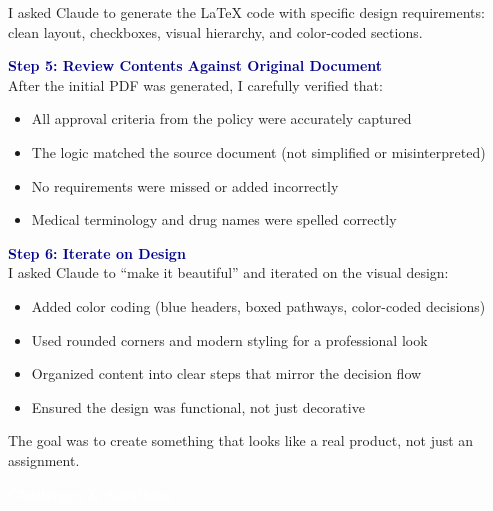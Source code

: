 \documentclass[11pt,letterpaper]{article}
\begin{document}
I asked Claude to generate the LaTeX code with specific design requirements: clean layout, checkboxes, visual hierarchy, and color-coded sections.

\vspace{0.25cm}

\textcolor{darkblue}{\bfseries\large Step 5: Review Contents Against Original Document}\\[0.1cm]
After the initial PDF was generated, I carefully verified that:
\begin{itemize}
    \item All approval criteria from the policy were accurately captured
    \item The logic matched the source document (not simplified or misinterpreted)
    \item No requirements were missed or added incorrectly
    \item Medical terminology and drug names were spelled correctly
\end{itemize}

\vspace{0.25cm}

\textcolor{darkblue}{\bfseries\large Step 6: Iterate on Design}\\[0.1cm]
I asked Claude to ``make it beautiful'' and iterated on the visual design:
\begin{itemize}
    \item Added color coding (blue headers, boxed pathways, color-coded decisions)
    \item Used rounded corners and modern styling for a professional look
    \item Organized content into clear steps that mirror the decision flow
    \item Ensured the design was functional, not just decorative
\end{itemize}

The goal was to create something that looks like a real product, not just an assignment.

\newpage


\vspace{0.3cm}

\begin{center}
    \textcolor{white}{\LARGE\bfseries\sffamily Challenges \& Solutions}
\end{center}
\end{document}

